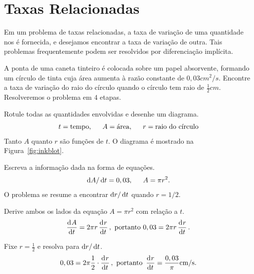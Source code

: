 \begin{sectionproblems}


\end{sectionproblems}

\section{Taxas Relacionadas}
\label{sec:relatedrates}

Em um problema de taxas relacionadas, a taxa de variação de uma quantidade
nos é fornecida, e desejamos encontrar a taxa de variação de outra. Tais
problemas frequentemente podem ser resolvidos por diferenciação implícita.

\begin{example}
  A ponta de uma caneta tinteiro é colocada sobre um papel absorvente,
  formando um círculo de tinta cuja área aumenta à razão constante de
  $0,03\si{cm^2/s}$. Encontre a taxa de variação do raio do círculo quando
  o círculo tem raio de $\frac{1}{2}\si{cm}$. Resolveremos o problema em
  $4$ etapas.
\begin{stepanalysis}
\item Rotule todas as quantidades envolvidas e desenhe um diagrama.
      $$
        t = \text{tempo}, \hspace{1.5em} A = \text{área}, \hspace{1.5em}
        r = \text{raio do círculo}
      $$
      Tanto $A$ quanto $r$ são funções de $t$. O diagrama é mostrado na
      Figura~\ref{fig:inkblot}.
\item Escreva a informação dada na forma de equações.
      $$
        \dif A/\dt = 0,03, \hspace{1.5em} A = \pi r^2.
      $$
      O problema se resume a encontrar $\dif r/\dt$ quando $r = 1/2$.
\item Derive ambos os lados da equação $A = \pi r^2$ com relação a $t$.
      $$
        \dod A t = 2\pi r \dod r t, \text{ portanto } 0,03 = 2 \pi r
                                                      \dod r t .
      $$
\item Fixe $r = \frac{1}{2}$ e resolva para $\dif r/\dt$.
      $$
        0,03 = 2 \pi \frac{1}{2} \cdot \dod r t, \text{ portanto }
          \dod r t = \frac{0,03}{\pi}\si{cm/s}.
      $$
\end{stepanalysis}
\end{example}

